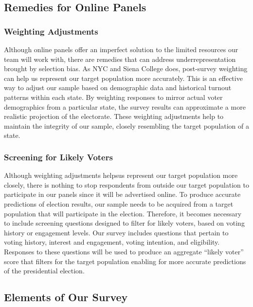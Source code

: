 \documentclass[
  letterpaper,
  DIV=11,
  numbers=noendperiod]{scrartcl}
\begin{document}
\hypertarget{remedies-for-online-panels}{%
\subsection{Remedies for Online
Panels}\label{remedies-for-online-panels}}

\hypertarget{weighting-adjustments}{%
\subsubsection{Weighting Adjustments}\label{weighting-adjustments}}

Although online panels offer an imperfect solution to the limited
resources our team will work with, there are remedies that can address
underrepresentation brought by selection bias. As NYC and Siena College
does, post-survey weighting can help us represent our target population
more accurately. This is an effective way to adjust our sample based on
demographic data and historical turnout patterns within each state. By
weighting responses to mirror actual voter demographics from a
particular state, the survey results can approximate a more realistic
projection of the electorate. These weighting adjustments help to
maintain the integrity of our sample, closely resembling the target
population of a state.

\hypertarget{screening-for-likely-voters}{%
\subsubsection{Screening for Likely
Voters}\label{screening-for-likely-voters}}

Although weighting adjustments helpsus represent our target population
more closely, there is nothing to stop respondents from outside our
target population to participate in our panels since it will be
advertised online. To produce accurate predictions of election results,
our sample needs to be acquired from a target population that will
participate in the election. Therefore, it becomes necessary to include
screening questions designed to filter for likely voters, based on
voting history or engagement levels. Our survey includes questions that
pertain to voting history, interest and engagement, voting intention,
and eligibility. Responses to these questions will be used to produce an
aggregate ``likely voter'' score that filters for the target population
enabling for more accurate predictions of the presidential election.

\hypertarget{elements-of-our-survey}{%
\subsection{Elements of Our Survey}\label{elements-of-our-survey}}
\end{document}
